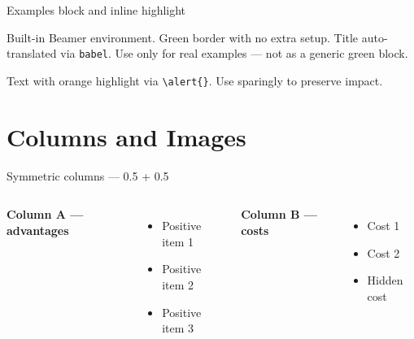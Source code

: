 \documentclass[aspectratio=169,t,xcolor=table]{beamer}
\begin{document}
\begin{frame}{Examples block and inline highlight}

    \begin{examples}
        Built-in Beamer environment. Green border with no extra setup. Title auto-translated via \texttt{babel}. Use only for real examples — not as a generic green block.
    \end{examples}

    \vspace{0.8em}

    Text with \alert{orange highlight} via \texttt{\textbackslash alert\{\}}.
    Use sparingly to preserve impact.

\end{frame}


\section[UFGBlue]{Columns and Images}

\begin{frame}{Symmetric columns — 0.5 + 0.5}

    \begin{columns}
        \textbf{Column A — advantages}
        \begin{itemize}
            \item Positive item 1
            \item Positive item 2
            \item Positive item 3
        \end{itemize}

        \textbf{Column B — costs}
        \begin{itemize}
            \item Cost 1
            \item Cost 2
            \item \alert{Hidden cost}
        \end{itemize}
    \end{columns}

\end{frame}
\end{document}

